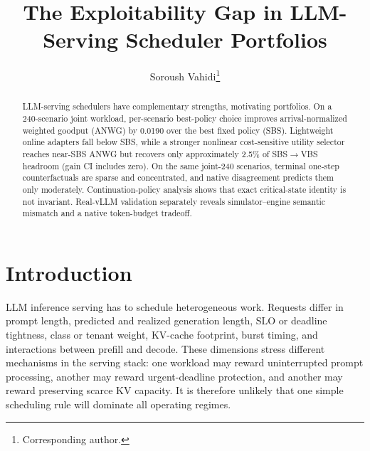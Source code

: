 \documentclass[runningheads]{llncs}
\begin{document}
\title{The Exploitability Gap in LLM-Serving Scheduler Portfolios}

\author{Soroush Vahidi\thanks{Corresponding author.}}

\newcommand{\anwg}{ANWG}
\newcommand{\sbs}{SBS}
\newcommand{\vbs}{VBS}
\newcommand{\policy}[1]{\texttt{\detokenize{#1}}}

\maketitle

\begin{abstract}
LLM-serving schedulers have complementary strengths, motivating portfolios. On
a 240-scenario joint workload, per-scenario best-policy choice improves
arrival-normalized weighted goodput (ANWG) by 0.0190 over the best fixed
policy (\sbs{}). Lightweight online adapters fall below \sbs{}, while a
stronger nonlinear cost-sensitive utility selector reaches near-\sbs{} ANWG but
recovers only approximately 2.5\% of \sbs{}$\rightarrow$\vbs{} headroom (gain
CI includes zero). On the same joint-240 scenarios, terminal one-step
counterfactuals are sparse and concentrated, and native disagreement predicts
them only moderately. Continuation-policy analysis shows that exact
critical-state identity is not invariant. Real-vLLM validation separately
reveals simulator--engine semantic mismatch and a native token-budget
tradeoff.

\end{abstract}

\section{Introduction}
\label{sec:introduction}

LLM inference serving has to schedule heterogeneous work. Requests differ in
prompt length, predicted and realized generation length, SLO or deadline
tightness, class or tenant weight, KV-cache footprint, burst timing, and
interactions between prefill and decode. These dimensions stress different
mechanisms in the serving stack: one workload may reward uninterrupted prompt
processing, another may reward urgent-deadline protection, and another may
reward preserving scarce KV capacity. It is therefore unlikely that one simple
scheduling rule will dominate all operating regimes.
\end{document}
